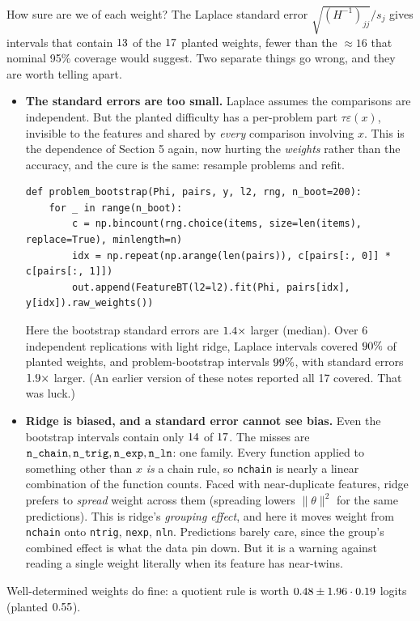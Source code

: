 \documentclass[11pt]{article}
\theoremstyle{definition}
\theoremstyle{plain}
\theoremstyle{remark}
\newcommand{\code}[1]{\texttt{#1}}
\renewcommand{\_}{\oldunderscore\allowbreak}
\newcommand{\file}[1]{\textcolor{blue!50!black}{\texttt{#1}}}
\newcommand{\codefrom}[1]{\par\smallskip\noindent{\footnotesize\textbf{From} \file{#1}}}
\begin{document}
How sure are we of each weight? The Laplace standard error $\sqrt{(H^{-1})_{jj}}/s_j$ gives intervals that contain $13$ of the $17$ planted weights,
fewer than the $\approx16$ that nominal 95\% coverage would suggest. Two separate things go wrong, and they are worth telling apart.
\begin{itemize}[nosep]
\item \textbf{The standard errors are too small.} Laplace assumes the comparisons are independent. But the planted difficulty has a
  per-problem part $\tau\varepsilon(x)$, invisible to the features and shared by \emph{every} comparison involving $x$. This is the dependence of Section 5 again, now
  hurting the \emph{weights} rather than the accuracy, and the cure is the same: resample problems and refit.

\codefrom{src/calcdiff/models/feature\_bt.py}
\begin{lstlisting}
def problem_bootstrap(Phi, pairs, y, l2, rng, n_boot=200):
    for _ in range(n_boot):
        c = np.bincount(rng.choice(items, size=len(items), replace=True), minlength=n)
        idx = np.repeat(np.arange(len(pairs)), c[pairs[:, 0]] * c[pairs[:, 1]])
        out.append(FeatureBT(l2=l2).fit(Phi, pairs[idx], y[idx]).raw_weights())
\end{lstlisting}
  Here the bootstrap standard errors are $1.4\times$ larger (median). Over 6 independent replications with light ridge, Laplace intervals covered
  $90\%$ of planted weights, and problem-bootstrap intervals $99\%$, with standard errors $1.9\times$ larger.
  (An earlier version of these notes reported all 17 covered. That was luck.)
\item \textbf{Ridge is biased, and a standard error cannot see bias.} Even the bootstrap intervals contain only $14$ of $17$. The misses
  are $\GMissed$: one family. Every function applied to something other than $x$ \emph{is} a chain rule, so \code{n\_chain} is nearly a linear combination
  of the function counts. Faced with near-duplicate features, ridge prefers to \emph{spread} weight across them (spreading lowers $\|\theta\|^2$ for the
  same predictions). This is ridge's \emph{grouping effect}, and here it moves weight from \code{n\_chain} onto \code{n\_trig}, \code{n\_exp}, \code{n\_ln}. Predictions barely
  care, since the group's combined effect is what the data pin down. But it is a warning against reading a single weight literally when its feature has
  near-twins.
\end{itemize}
Well-determined weights do fine: a quotient rule is worth $0.48\pm1.96\cdot0.19$ logits (planted $0.55$).
\end{document}
